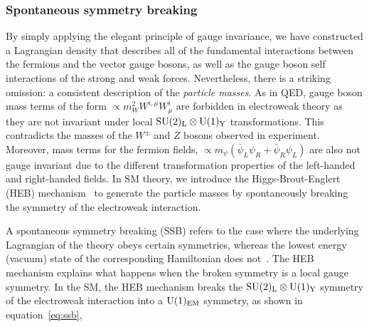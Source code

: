 

\FloatBarrier
\subsubsection{Spontaneous symmetry breaking}
By simply applying the elegant principle of gauge invariance, we have constructed a Lagrangian density that describes all of the fundamental interactions between the fermions and the vector gauge bosons, as well as the gauge boson self interactions of the strong and weak forces. Nevertheless, there is a striking omission: a consistent description of the \textit{particle masses}. As in QED, gauge boson mass terms of the form $\propto m_W^2W^{i,\mu}W^i_\mu$ are forbidden in electroweak theory as they are not invariant under local ${\rm{SU}(2)_{\rm{L}}}\otimes{\rm{U}}(1)_{\rm{Y}}$ transformations. This contradicts the masses of the $W^{\pm}$ and $Z$ bosons observed in experiment. Moreover, mass terms for the fermion fields, $\propto m_{\psi}(\bar{\psi}_L\psi_R+\bar{\psi}_R\psi_L)$ are also not gauge invariant due to the different transformation properties of the left-handed and right-handed fields. In SM theory, we introduce the Higgs-Brout-Englert (HEB) mechanism~\cite{Englert:1964et,HIGGS1964132,Higgs:1964pj,Guralnik:1964eu,PhysRev.145.1156,PhysRev.155.1554} to generate the particle masses by spontaneously breaking the symmetry of the electroweak interaction.

A spontaneous symmetry breaking (SSB) refers to the case where the underlying Lagrangian of the theory obeys certain symmetries, whereas the lowest energy (vacuum) state of the corresponding Hamiltonian does not~\cite{Aitchison:2004cs}. The HEB mechanism explains what happens when the broken symmetry is a local gauge symmetry. In the SM, the HEB mechanism breaks the ${\rm{SU}(2)_{\rm{L}}}\otimes{\rm{U}}(1)_{\rm{Y}}$ symmetry of the electroweak interaction into a ${\rm{U}}(1)_{\rm{EM}}$ symmetry, as shown in equation~\ref{eq:ssb},

